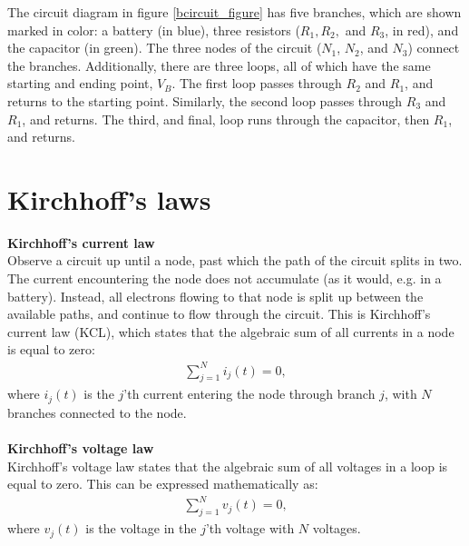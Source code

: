 \noindent The circuit diagram in figure \ref{bcircuit_figure} has five branches, which are shown marked in color: a battery (in blue), three resistors ($R_1, R_2,$ and $R_3$, in red), and the capacitor (in green). The three nodes of the circuit ($N_1$, $N_2$, and $N_3$) connect the branches. Additionally, there are three loops, all of which have the same starting and ending point, $V_{B}$. The first loop passes through $R_2$ and $R_1$, and returns to the starting point. Similarly, the second loop passes through $R_3$ and $R_1$, and returns. The third, and final, loop runs through the capacitor, then $R_1$, and returns. 

\section{Kirchhoff's laws}\label{Klaws}
\textbf{Kirchhoff's current law}
\\
Observe a circuit up until a node, past which the path of the circuit splits in two. The current encountering the node does not accumulate (as it would, e.g. in a battery). Instead, all electrons flowing to that node is split up between the available paths, and continue to flow through the circuit. This is Kirchhoff’s current law (KCL), which states that the algebraic sum of all currents in a node is equal to zero:
\begin{align*}
\sum_{j=1}^{N} i_{j}(t) = 0,
\end{align*}
where $i_{j}(t)$ is the $j$'th current entering the node through branch $j$, with $N$ branches connected to the node. \cite[page~32]{bcircuit}
\\
\\
\textbf{Kirchhoff's voltage law}
\\
Kirchhoff's voltage law states that the algebraic sum of all voltages in a loop is equal to zero. This can be expressed mathematically as:
\begin{align*}
\sum_{j=1}^{N} v_{j}(t) = 0,
\end{align*}
where $v_{j}(t)$ is the voltage in the $j$'th voltage with $N$ voltages. \citep[page~34]{bcircuit}\\


